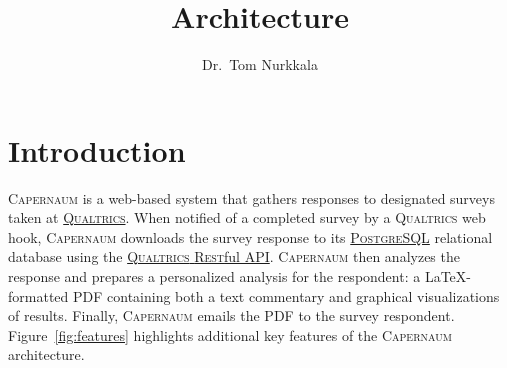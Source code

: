 \documentclass{article}
\title{\caper{} Architecture}
\author{Dr.\ Tom Nurkkala}
\newcommand{\caper}{\textsc{Capernaum}}
\newcommand{\pg}{\textsc{PostgreSQL}}
\newcommand{\rest}{\textsc{Rest}ful}
\newcommand{\qual}{\textsc{Qualtrics}}
\begin{document}
\maketitle

\section{Introduction}
\label{sec:introduction}

\caper{} is a web-based system
that gathers responses to designated surveys taken at \href{https://www.qualtrics.com/}{\qual}.
When notified of a completed survey by a \qual{} web hook,
\caper{}
downloads the survey response
to its \href{https://www.postgresql.org/}{\pg{}} relational database
using the
\href{https://api.qualtrics.com/}{\qual{} \rest{} API}.
\caper{} then
analyzes the response and
prepares a personalized analysis for the respondent:
a \LaTeX-formatted PDF containing both a text commentary
and graphical visualizations of results.
Finally, \caper{}
emails the PDF to the survey respondent.
Figure~\ref{fig:features} highlights additional
key features of the \caper{} architecture.
\end{document}
